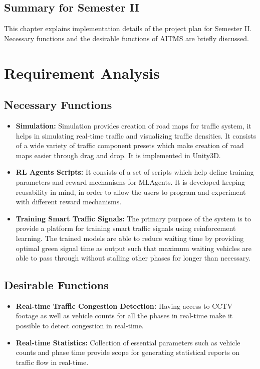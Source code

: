 \documentclass[openany,12pt]{report}
\begin{document}
	
	\newpage
	\subsection{Summary for Semester II}
	\hspace*{0.5 in}This chapter explains implementation details of the project plan for
Semester II. Necessary functions and the desirable functions of AITMS are briefly discussed.
	
	\section{Requirement Analysis}
	
	\subsection{Necessary Functions}
	\begin{itemize}
		\item{\textbf{Simulation: }Simulation provides creation of road maps for traffic system, it helps in simulating real-time traffic and visualizing traffic densities. It consists of a wide variety of traffic component presets which make creation of road maps easier through drag and drop. It is implemented in Unity3D.}
		\item{\textbf{RL Agents Scripts: }It consists of a set of scripts which help define training parameters and reward mechanisms for MLAgents. It is developed keeping reusability in mind, in order to allow the users to program and experiment with different reward mechanisms.}
		\item{\textbf{Training Smart Traffic Signals: }The primary purpose of the system is to provide a platform for training smart traffic signals using reinforcement learning. The trained models are able to reduce waiting time by providing optimal green signal time as output such that maximum waiting vehicles are able to pass through without stalling other phases for longer than necessary.}
	\end{itemize}
	
	\subsection{Desirable  Functions}
	\begin{itemize}
		\item{\textbf{Real-time Traffic Congestion Detection: }Having access to CCTV footage as well as vehicle counts for all the phases in real-time make it possible to detect congestion in real-time.}
		\item{\textbf{Real-time Statistics: }Collection of essential parameters such as vehicle counts and phase time provide scope for generating statistical reports on traffic flow in real-time.}
	\end{itemize}
		
\end{document}
